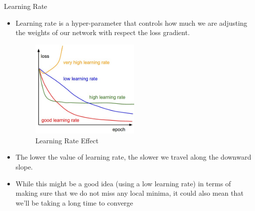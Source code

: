 \begin{frame}{Learning Rate}
    \begin{itemize}
        \item Learning rate is a hyper-parameter that controls how much we are adjusting the weights of our network with respect the loss gradient. 
        \begin{figure}[H]
    		\centering
    		\includegraphics[width=0.5\textwidth]{Images/lr.png}
    		\caption{Learning Rate Effect}
	    \end{figure}
	    \item The lower the value of learning rate, the slower we travel along the downward slope.
	    \item While this might be a good idea (using a low learning rate) in terms of making sure that we do not miss any local minima, it could also mean that we’ll be taking a long time to converge
    \end{itemize}        
\end{frame}


